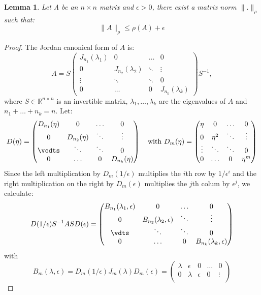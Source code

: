 \documentclass[a4paper,11pt]{report}
\newtheorem{lemma}[theorem]{Lemma}
\newcommand{\R}{{\mathbb R}}
\begin{document}
\begin{lemma}\label{eigennorm}
  Let A be an $n \times n$ matrix and $\epsilon > 0$, there exist a matrix norm $\|. \|_\rho$ 
  such that:
  $$\|A\|_\rho \leq \rho(A) + \epsilon$$
\end{lemma}
\begin{proof}
  The Jordan canonical form of $A$ is:
  $$A = S \begin{pmatrix}
  J_{n_1}(\lambda_1) & 0 & \ldots & 0 \\
  0 & J_{n_2}(\lambda_2) & \ddots & \vdots \\
  \vdots & \ddots & \ddots & 0\\
  0 & \ldots & 0 & J_{n_k}(\lambda_k)
  \end{pmatrix}S^{-1},$$
  where $S \in \R^{n\times n}$ is an invertible matrix, $\lambda_1, \ldots, \lambda_k$ 
  are the eigenvalues of $A$ and $n_1 + \ldots + n_k = n$. Let:
  $$D(\eta) = \begin{pmatrix}
  D_{n_1}(\eta) & 0 & \ldots & 0 \\
  0 & D_{n_2}(\eta) & \ddots & \vdots \\
  \vodts & \ddots & \ddots & 0\\
  0 & \ldots & 0 & D_{n_k}(\eta)
  \end{pmatrix}\quad \text{with } D_m(\eta)= \begin{pmatrix}
  \eta & 0 & \ldots & 0 \\
  0 & \eta^2 & \ddots & \vdots\\
  \vdots & \ddots & \ddots & 0 \\
  0 & \ldots & 0 & \eta^m
  \end{pmatrix}$$
  Since the left multiplication by $D_m(1/\epsilon)$ multiplies the $i$th row by $1/\epsilon^i$ 
  and the right multiplication on the right by $D_m(\epsilon)$ multiplies the $j$th 
  colum by $\epsilon^j$, we calculate:
  $$D(1/\epsilon)S^{-1}ASD(\epsilon)=\begin{pmatrix}
  B_{n_1}(\lambda_1, \epsilon) & 0 & \ldots & 0 \\
  0 & B_{n_2}(\lambda_2, \epsilon) & \ddots & \vdots \\
  \vdts & \ddots & \ddots & 0\\
  0 & \ldots & 0 & B_{n_k}(\lambda_k, \epsilon)  \end{pmatrix}$$
  with 
  $$B_m(\lambda, \epsilon) = D_m(1/\epsilon)J_m(\lambda)D_m(\epsilon)=
  \begin{pmatrix}
   \lambda & \epsilon &  0 & \ldots & 0 \\
  0 & \lambda & \epsilon &  0 & \vdots \\

\end{pmatrix}$$
\end{proof}
\end{document}
